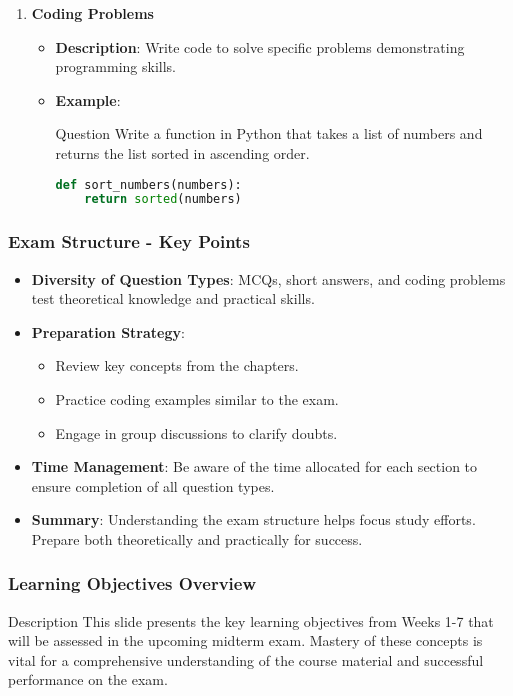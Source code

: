 \documentclass[aspectratio=169]{beamer}
\begin{document}
\begin{frame}[fragile]
\begin{enumerate}
        \item \textbf{Coding Problems}
        \begin{itemize}
            \item \textbf{Description}: Write code to solve specific problems demonstrating programming skills.
            \item \textbf{Example}:
            \begin{block}{Question}
                Write a function in Python that takes a list of numbers and returns the list sorted in ascending order.
            \end{block}
            \begin{lstlisting}[language=Python]
def sort_numbers(numbers):
    return sorted(numbers)
            \end{lstlisting}
        \end{itemize}
    \end{enumerate}
\end{frame}

\begin{frame}[fragile]
    \frametitle{Exam Structure - Key Points}
    \begin{itemize}
        \item \textbf{Diversity of Question Types}: MCQs, short answers, and coding problems test theoretical knowledge and practical skills.
        \item \textbf{Preparation Strategy}:
        \begin{itemize}
            \item Review key concepts from the chapters.
            \item Practice coding examples similar to the exam.
            \item Engage in group discussions to clarify doubts.
        \end{itemize}
        \item \textbf{Time Management}: Be aware of the time allocated for each section to ensure completion of all question types.
        \item \textbf{Summary}: Understanding the exam structure helps focus study efforts. Prepare both theoretically and practically for success.
    \end{itemize}
\end{frame}

\begin{frame}
    \frametitle{Learning Objectives Overview}
    \begin{block}{Description}
        This slide presents the key learning objectives from Weeks 1-7 that will be assessed in the upcoming midterm exam. Mastery of these concepts is vital for a comprehensive understanding of the course material and successful performance on the exam.
    \end{block}
\end{frame}
\end{document}
